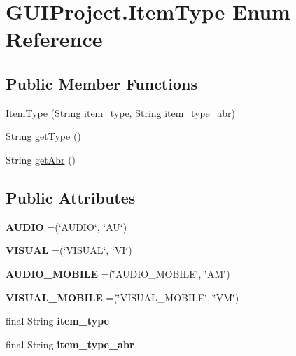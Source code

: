 \hypertarget{enum_g_u_i_project_1_1_item_type}{}\section{G\+U\+I\+Project.\+Item\+Type Enum Reference}
\label{enum_g_u_i_project_1_1_item_type}
\subsection*{Public Member Functions}
\begin{DoxyCompactItemize}
\item 
\mbox{\hyperlink{enum_g_u_i_project_1_1_item_type_a162bda10bec618714954bffcb302a36c}{Item\+Type}} (String item\+\_\+type, String item\+\_\+type\+\_\+abr)
\item 
String \mbox{\hyperlink{enum_g_u_i_project_1_1_item_type_a6e06aefe696a559d723840adc3b167c5}{get\+Type}} ()
\item 
String \mbox{\hyperlink{enum_g_u_i_project_1_1_item_type_a9b7f30062666c3c26b96b5ec76933731}{get\+Abr}} ()
\end{DoxyCompactItemize}
\subsection*{Public Attributes}
\begin{DoxyCompactItemize}
\item 
\mbox{\label{enum_g_u_i_project_1_1_item_type_a6c7b0e4982a64c70b9138998d5048ba6}} 
{\bfseries A\+U\+D\+IO} =(\char`\"{}A\+U\+D\+IO\char`\"{}, \char`\"{}AU\char`\"{})
\item 
\mbox{\label{enum_g_u_i_project_1_1_item_type_a85c430a61fd43b04f43333bd51d54b35}} 
{\bfseries V\+I\+S\+U\+AL} =(\char`\"{}V\+I\+S\+U\+AL\char`\"{}, \char`\"{}VI\char`\"{})
\item 
\mbox{\label{enum_g_u_i_project_1_1_item_type_a346b43bda79e5e0736ea724d18b0a15b}} 
{\bfseries A\+U\+D\+I\+O\+\_\+\+M\+O\+B\+I\+LE} =(\char`\"{}A\+U\+D\+I\+O\+\_\+\+M\+O\+B\+I\+LE\char`\"{}, \char`\"{}AM\char`\"{})
\item 
\mbox{\label{enum_g_u_i_project_1_1_item_type_a865b9c4451133c9bb6903543c47fac14}} 
{\bfseries V\+I\+S\+U\+A\+L\+\_\+\+M\+O\+B\+I\+LE} =(\char`\"{}V\+I\+S\+U\+A\+L\+\_\+\+M\+O\+B\+I\+LE\char`\"{}, \char`\"{}VM\char`\"{})
\item 
\mbox{\label{enum_g_u_i_project_1_1_item_type_a9eb9043a87d96a08d12370dd9506eedc}} 
final String {\bfseries item\+\_\+type}
\item 
\mbox{\label{enum_g_u_i_project_1_1_item_type_ab2e62ad1d55610867e2c9fe5bc92c1db}} 
final String {\bfseries item\+\_\+type\+\_\+abr}
\end{DoxyCompactItemize}


